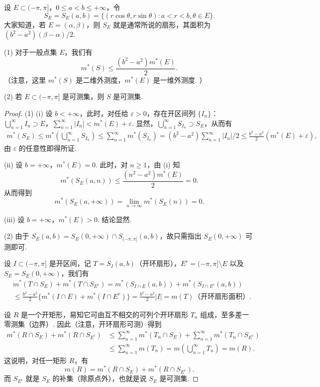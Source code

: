 \documentclass[../../main.tex]{subfiles}%
\begin{document}
\begin{example}\label{example:极坐标变换与可测性}
设 \(E \subset (-\pi, \pi]\)，\(0 \leqslant a < b \leqslant +\infty\)，令
\[
S_E = S_E(a,b)=\{(r\cos\theta, r\sin\theta): a < r < b, \theta \in E\}.
\]
大家知道，若 \(E = (\alpha, \beta)\)，则 \(S_E\) 就是通常所说的扇形，其面积为 \((b^2 - a^2)(\beta - \alpha)/2\).

(1) 对于一般点集 \(E\)，我们有
\[
m^*(S) \leqslant \frac{(b^2 - a^2)m^*(E)}{2}.
\]
（注意，这里 \(m^*(S)\) 是二维外测度，\(m^*(E)\) 是一维外测度. ）

(2) 若 \(E \subset (-\pi, \pi]\) 是可测集，则 \(S\) 是可测集.
\end{example}
\begin{proof}
(1) (i) 设 \(b < +\infty\)，此时，对任给 \(\varepsilon > 0\)，存在开区间列 \(\{I_n\}\)：\(\bigcup_{n = 1}^{\infty} I_n \supset E\)，\(\sum_{n = 1}^{\infty}|I_n| < m^*(E) + \varepsilon\). 显然，\(\bigcup_{n = 1}^{\infty} S_{I_n} \supset S_E\)，从而有
\begin{align*}
m^*(S_E) \leqslant m^*\left(\bigcup_{n = 1}^{\infty} S_{I_n}\right) \leqslant \sum_{n = 1}^{\infty}m^*(S_{I_n})
= (b^2 - a^2)\sum_{n = 1}^{\infty}|I_n|/2 \leqslant \frac{b^2 - a^2}{2}(m^*(E) + \varepsilon),
\end{align*}
由 \(\varepsilon\) 的任意性即得所证.

(ii) 设 \(b = +\infty\)，\(m^*(E) = 0\). 此时，对 \(n \geqslant 1\)，由 (i) 知
\[
m^*(S_E(a,n)) \leqslant \frac{(n^2 - a^2)m^*(E)}{2} = 0.
\]
从而得到
\[
m^*(S_E(a, +\infty)) = \lim_{n \to \infty}m^*(S_E(n)) = 0.
\]

(iii) 设 \(b = +\infty\)，\(m^*(E) > 0\). 结论显然.

(2) 由于 \(S_E(a,b) = S_E(0, +\infty) \cap S_{(-\pi, \pi]}(a,b)\)，故只需指出 \(S_E(0, +\infty)\) 可测即可.

设 \(I \subset (-\pi, \pi]\) 是开区间，记 \(T = S_I(a,b)\)（开环扇形），\(E^c = (-\pi, \pi] \setminus E\) 以及 \(S_E = S_E(0, +\infty)\)，我们有
\begin{align*}
&m^*(T \cap S_E) + m^*(T \cap S_{E^c}) 
= m^*(S_{I \cap E}(a,b)) + m^*(S_{I \cap E^c}(a,b))\\
&\leqslant \frac{b^2 - a^2}{2}\{m^*(I \cap E) + m^*(I \cap E^c)\}
= \frac{b^2 - a^2}{2}|I| = m(T) \text{（开环扇形面积）}.
\end{align*}

设 \(R\) 是一个开矩形，易知它可由互不相交的可列个开环扇形 \(T_n\) 组成，至多差一零测集（边界）. 因此（注意，开环扇形可测）得到
\begin{align*}
m^*(R \cap S_E) + m^*(R \cap S_{E^c}) 
&\leqslant \sum_{n = 1}^{\infty}m^*(T_n \cap S_E) + \sum_{n = 1}^{\infty}m^*(T_n \cap S_{E^c})\\
&\leqslant \sum_{n = 1}^{\infty}m(T_n) = m\left(\bigcup_{n = 1}^{\infty} T_n\right) = m(R).
\end{align*}
这说明，对任一矩形 \(R\)，有
\[
m(R) = m^*(R \cap S_E) + m^*(R \cap S_{E^c}).
\]
而 \(S_{E^c}\) 就是 \(S_E\) 的补集（除原点外），也就是说 \(S_E\) 是可测集. 
\end{proof}
\end{document}
